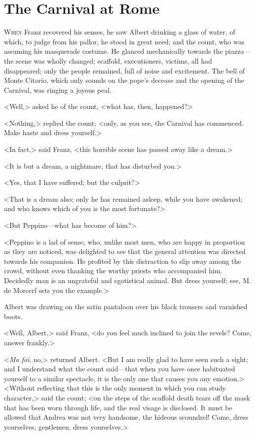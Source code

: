 \chapter{The Carnival at Rome} 

 \lettrine{W}{hen} Franz recovered his senses, he saw Albert drinking a glass of water, of which, to judge from his pallor, he stood in great need; and the count, who was assuming his masquerade costume. He glanced mechanically towards the piazza—the scene was wholly changed; scaffold, executioners, victims, all had disappeared; only the people remained, full of noise and excitement. The bell of Monte Citorio, which only sounds on the pope's decease and the opening of the Carnival, was ringing a joyous peal. 

 <Well,> asked he of the count, <what has, then, happened?> 

 <Nothing,> replied the count; <only, as you see, the Carnival has commenced. Make haste and dress yourself.> 

 <In fact,> said Franz, <this horrible scene has passed away like a dream.> 

 <It is but a dream, a nightmare, that has disturbed you.> 

 <Yes, that I have suffered; but the culprit?> 

 <That is a dream also; only he has remained asleep, while you have awakened; and who knows which of you is the most fortunate?> 

 <But Peppino—what has become of him?> 

 <Peppino is a lad of sense, who, unlike most men, who are happy in proportion as they are noticed, was delighted to see that the general attention was directed towards his companion. He profited by this distraction to slip away among the crowd, without even thanking the worthy priests who accompanied him. Decidedly man is an ungrateful and egotistical animal. But dress yourself; see, M. de Morcerf sets you the example.> 

 Albert was drawing on the satin pantaloon over his black trousers and varnished boots. 

 <Well, Albert,> said Franz, <do you feel much inclined to join the revels? Come, answer frankly.> 

 <\textit{Ma foi}, no,> returned Albert. <But I am really glad to have seen such a sight; and I understand what the count said—that when you have once habituated yourself to a similar spectacle, it is the only one that causes you any emotion.>  <Without reflecting that this is the only moment in which you can study character,> said the count; <on the steps of the scaffold death tears off the mask that has been worn through life, and the real visage is disclosed. It must be allowed that Andrea was not very handsome, the hideous scoundrel! Come, dress yourselves, gentlemen, dress yourselves.> 

